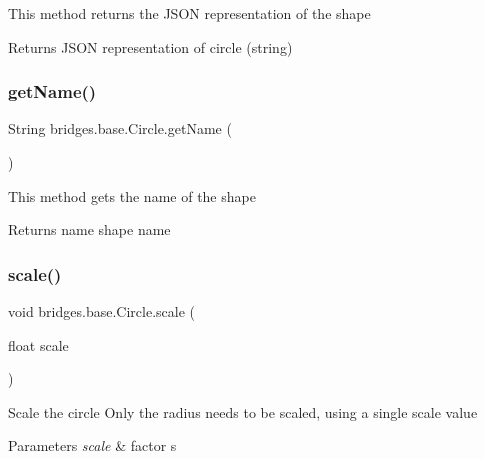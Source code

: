 This method returns the J\+S\+ON representation of the shape

\begin{DoxyReturn}{Returns}
J\+S\+ON representation of circle (string) 
\end{DoxyReturn}
\mbox{\label{classbridges_1_1base_1_1_circle_a3782ea68f0419747c00bd8b2bfa31462}} 
\subsubsection{\texorpdfstring{getName()}{getName()}}
{\footnotesize\ttfamily String bridges.\+base.\+Circle.\+get\+Name (\begin{DoxyParamCaption}{ }\end{DoxyParamCaption})}

This method gets the name of the shape

\begin{DoxyReturn}{Returns}
name shape name 
\end{DoxyReturn}
\mbox{\label{classbridges_1_1base_1_1_circle_acbb48177b6e99326294cd90f74b58a27}} 
\subsubsection{\texorpdfstring{scale()}{scale()}}
{\footnotesize\ttfamily void bridges.\+base.\+Circle.\+scale (\begin{DoxyParamCaption}\item[{float}]{scale }\end{DoxyParamCaption})}

Scale the circle Only the radius needs to be scaled, using a single scale value


\begin{DoxyParams}{Parameters}
{\em scale} & factor s \\
\hline
\end{DoxyParams}
\mbox{\label{classbridges_1_1base_1_1_circle_ac11cce75c482bb5c5751dfd1d5353b44}} 
